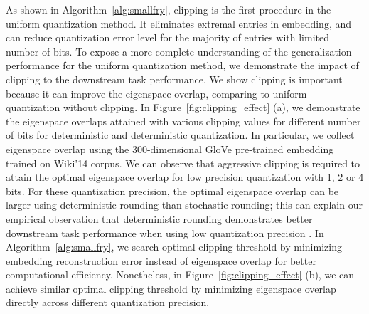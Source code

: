 As shown in Algorithm~\ref{alg:smallfry}, clipping is the first procedure in the uniform quantization method. It eliminates extremal entries in embedding, and can reduce quantization error level for the majority of entries with limited number of bits. To expose a more complete understanding of the generalization performance for the uniform quantization method, we demonstrate the impact of clipping to the downstream task performance. We show clipping is important because it can improve the eigenspace overlap, comparing to uniform quantization without clipping. In Figure~\ref{fig:clipping_effect} (a), we demonstrate the eigenspace overlaps attained with various clipping values for different number of bits for deterministic and deterministic quantization. In particular, we collect eigenspace overlap using the 300-dimensional GloVe pre-trained embedding trained on Wiki'14 corpus. We can observe that aggressive clipping is required to attain the optimal eigenspace overlap for low precision quantization with 1, 2 or 4 bits. For these quantization precision, the optimal eigenspace overlap can be larger using deterministic rounding than stochastic rounding; this can explain our empirical observation that deterministic rounding demonstrates better downstream task performance when using low quantization precision . In Algorithm~\ref{alg:smallfry}, we search optimal clipping threshold by minimizing embedding reconstruction error instead of eigenspace overlap for better computational efficiency. Nonetheless, in Figure~\ref{fig:clipping_effect} (b), we can achieve similar optimal clipping threshold by minimizing eigenspace overlap directly across different quantization precision. 



